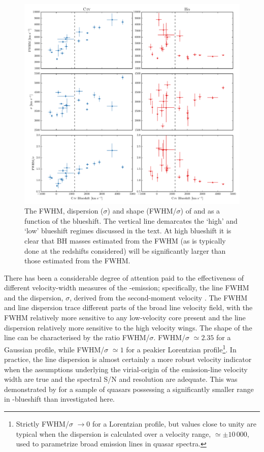 \begin{figure}
	\includegraphics[width=12cm]{figures/chapter02/civ_ha_comparisons.pdf} %
    \caption{The FWHM, dispersion ($\sigma$) and shape (FWHM/$\sigma$) of  and \ha as a function of the  blueshift. The vertical line demarcates the `high' and `low'  blueshift regimes discussed in the text. At high blueshift it is clear that BH masses estimated from the  FWHM (as is typically done at the redshifts considered) will be significantly larger than those estimated from the \ha FWHM.}
    \label{fig:line_comparison}
\end{figure} 

There has been a considerable degree of attention paid to the effectiveness of different velocity-width measures of the -emission; specifically, the line FWHM and the dispersion, $\sigma$, derived from the second-moment velocity \citep[e.g.][]{assef11, denney13}.
The FWHM and line dispersion trace different parts of the broad line velocity field, with the FWHM relatively more sensitive to any low-velocity core present and the line dispersion relatively more sensitive to the high velocity wings. 
The shape of the line can be characterised by the ratio FWHM/$\sigma$. 
FWHM/$\sigma$ $\simeq 2.35$ for a Gaussian profile, while FWHM/$\sigma$ $\simeq 1$ for a peakier Lorentzian profile\footnote{Strictly FWHM/$\sigma$ $\rightarrow 0$ for a Lorentzian profile, but values close to unity are typical when the dispersion is calculated over a velocity range, $\simeq\pm10\,000$\kms, used to parametrize broad emission lines in quasar spectra.}.
In practice, the line dispersion is almost certainly a more robust velocity indicator when the assumptions underlying the virial-origin of the emission-line velocity width are true and the spectral S/N and resolution are adequate.
This was demonstrated by \citet{denney13} for a sample of quasars possessing a significantly smaller range in -blueshift than investigated here.

